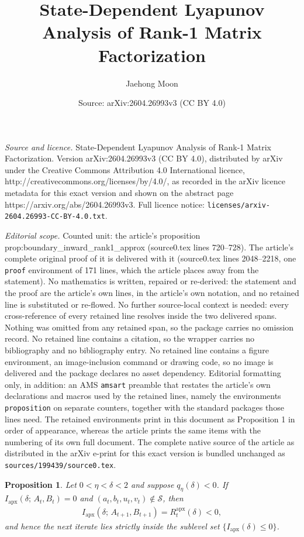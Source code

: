 \documentclass[10pt,a4paper]{amsart}
\title{State-Dependent Lyapunov Analysis of Rank-1 Matrix Factorization}
\author{Jaehong Moon}
\date{Source: arXiv:2604.26993v3 (CC BY 4.0)}
\newtheorem{proposition}{Proposition}
\newcommand{\apx}{\mathrm{apx}}
\newcommand{\iapx}{I_{\mathrm{apx}}}
\begin{document}
\maketitle

\noindent\emph{Source and licence.} State-Dependent Lyapunov Analysis of Rank-1 Matrix Factorization. Version arXiv:2604.26993v3 (CC BY 4.0), distributed by arXiv under the Creative Commons Attribution 4.0 International licence, http://creativecommons.org/licenses/by/4.0/, as recorded in the arXiv licence metadata for this exact version and shown on the abstract page https://arxiv.org/abs/2604.26993v3. Full licence notice: \texttt{licenses/arxiv-2604.26993-CC-BY-4.0.txt}.\par\smallskip

\noindent\textit{Editorial scope.} Counted unit: the article's proposition prop:boundary\_inward\_rank1\_approx (source0.tex lines 720--728). The article's complete original proof of it is delivered with it (source0.tex lines 2048--2218, one \texttt{proof} environment of 171 lines, which the article places away from the statement). No mathematics is written, repaired or re-derived: the statement and the proof are the article's own lines, in the article's own notation, and no retained line is substituted or re-flowed.  No further source-local context is needed: every cross-reference of every retained line resolves inside the two delivered spans.  Nothing was omitted from any retained span, so the package carries no omission record.  No retained line contains a citation, so the wrapper carries no bibliography and no bibliography entry.  No retained line contains a figure environment, an image-inclusion command or drawing code, so no image is delivered and the package declares no asset dependency.  Editorial formatting only, in addition: an AMS \texttt{amsart} preamble that restates the article's own declarations and macros used by the retained lines, namely the environments \texttt{proposition} on separate counters, together with the standard packages those lines need.  The retained environments print in this document as Proposition 1 in order of appearance, whereas the article prints the same items with the numbering of its own full document.  The complete native source of the article as distributed in the arXiv e-print for this exact version is bundled unchanged as \texttt{sources/199439/source0.tex}.
\begin{proposition}\label{prop:boundary_inward_rank1_approx}
Let $0 < \eta < \delta < 2$ and suppose $q_\eta(\delta) < 0$.
If $\iapx(\delta;\, A_t, B_t) = 0$ and $(a_t, b_t, u_t, v_t) \notin \mathcal{S}$,
then
\begin{align}
    \iapx(\delta;\, A_{t+1}, B_{t+1}) = R_t^\apx(\delta) < 0,
\end{align}
and hence the next iterate lies strictly inside the sublevel set $\{\iapx(\delta) \le 0\}$.
\end{proposition}
\end{document}
